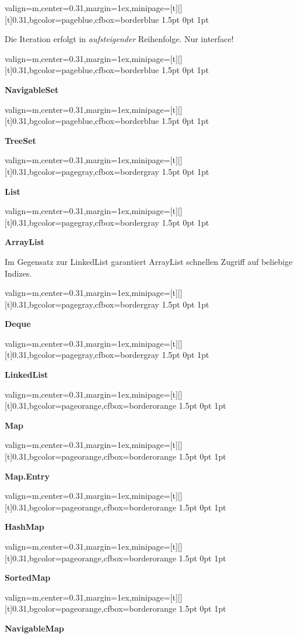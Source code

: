 \documentclass[11pt, a4paper, landscape]{article}
\newcommand{\fancyheader}[1]{
	\centerline{\sffamily \textbf{ \large #1}}
}
\newenvironment{fancybox}[2]
{
	\begin{adjustbox}{valign=m,center=0.31\textwidth,margin=1ex,minipage=[t][][t]{0.31\textwidth},bgcolor=#1,cfbox=#2 1.5pt 0pt 1pt}
	\begin{centering}
}
{
	\end{centering}
	\end{adjustbox}
}
\begin{document}
\begin{multicols}{3}
\begin{fancybox}{pageblue}{borderblue}
\raggedright{
	Die Iteration erfolgt in \emph{aufsteigender} Reihenfolge. Nur interface!
}
\end{fancybox}

\begin{fancybox}{pageblue}{borderblue}
\fancyheader{NavigableSet}

\end{fancybox}

\begin{fancybox}{pageblue}{borderblue}
\fancyheader{TreeSet}

\end{fancybox}

\begin{fancybox}{pagegray}{bordergray}
\fancyheader{List}

\end{fancybox}

\begin{fancybox}{pagegray}{bordergray}
\fancyheader{ArrayList}

\raggedright{
	Im Gegensatz zur LinkedList garantiert ArrayList schnellen Zugriff auf beliebige Indizes.
}
\end{fancybox}

\begin{fancybox}{pagegray}{bordergray}
\fancyheader{Deque}

\end{fancybox}

\begin{fancybox}{pagegray}{bordergray}
\fancyheader{LinkedList}

\end{fancybox}

\begin{fancybox}{pageorange}{borderorange}
\fancyheader{Map}

\end{fancybox}

\begin{fancybox}{pageorange}{borderorange}
\fancyheader{Map.Entry}

\end{fancybox}

\begin{fancybox}{pageorange}{borderorange}
\fancyheader{HashMap}

\end{fancybox}

\begin{fancybox}{pageorange}{borderorange}
\fancyheader{SortedMap}

\end{fancybox}

\begin{fancybox}{pageorange}{borderorange}
\fancyheader{NavigableMap}

\end{fancybox}


\end{multicols}
\end{document}
